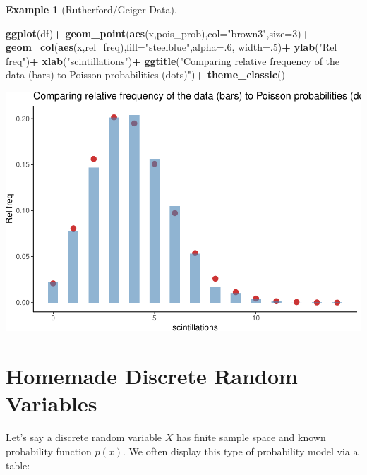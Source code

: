 \documentclass[
]{book}
\newenvironment{Shaded}{\begin{snugshade}}{\end{snugshade}}
\newcommand{\AttributeTok}[1]{\textcolor[rgb]{0.13,0.29,0.53}{#1}}
\newcommand{\DecValTok}[1]{\textcolor[rgb]{0.00,0.00,0.81}{#1}}
\newcommand{\FunctionTok}[1]{\textcolor[rgb]{0.13,0.29,0.53}{\textbf{#1}}}
\newcommand{\NormalTok}[1]{#1}
\newcommand{\SpecialCharTok}[1]{\textcolor[rgb]{0.81,0.36,0.00}{\textbf{#1}}}
\newcommand{\StringTok}[1]{\textcolor[rgb]{0.31,0.60,0.02}{#1}}
\theoremstyle{definition}
\theoremstyle{definition}
\newtheorem{example}{Example}[chapter]
\theoremstyle{definition}
\theoremstyle{definition}
\theoremstyle{remark}
\begin{document}
\begin{example}[Rutherford/Geiger Data]
\begin{Shaded}
\begin{Highlighting}[]
\FunctionTok{ggplot}\NormalTok{(df)}\SpecialCharTok{+}
  \FunctionTok{geom\_point}\NormalTok{(}\FunctionTok{aes}\NormalTok{(x,pois\_prob),}\AttributeTok{col=}\StringTok{"brown3"}\NormalTok{,}\AttributeTok{size=}\DecValTok{3}\NormalTok{)}\SpecialCharTok{+}
  \FunctionTok{geom\_col}\NormalTok{(}\FunctionTok{aes}\NormalTok{(x,rel\_freq),}\AttributeTok{fill=}\StringTok{"steelblue"}\NormalTok{,}\AttributeTok{alpha=}\NormalTok{.}\DecValTok{6}\NormalTok{, }\AttributeTok{width=}\NormalTok{.}\DecValTok{5}\NormalTok{)}\SpecialCharTok{+}
  \FunctionTok{ylab}\NormalTok{(}\StringTok{"Rel freq"}\NormalTok{)}\SpecialCharTok{+}
  \FunctionTok{xlab}\NormalTok{(}\StringTok{"scintillations"}\NormalTok{)}\SpecialCharTok{+}
  \FunctionTok{ggtitle}\NormalTok{(}\StringTok{"Comparing relative frequency of the data (bars) to Poisson probabilities (dots)"}\NormalTok{)}\SpecialCharTok{+}
  \FunctionTok{theme\_classic}\NormalTok{()}
\end{Highlighting}
\end{Shaded}

\includegraphics{math340-notes_files/figure-latex/unnamed-chunk-181-1.pdf}

\end{example}

\section{Homemade Discrete Random Variables}\label{custom-discrete-R}

Let's say a discrete random variable \(X\) has finite sample space and known probability function \(p(x)\). We often display this type of probability model via a table:
\end{document}
